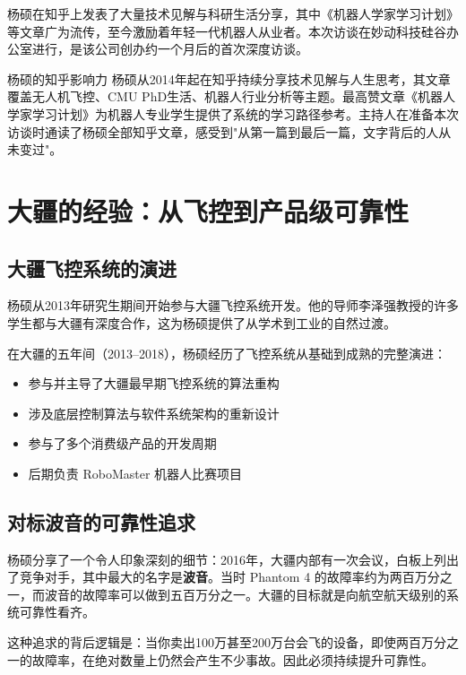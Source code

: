 \documentclass[a4paper]{article}
\begin{document}
杨硕在知乎上发表了大量技术见解与科研生活分享，其中《机器人学家学习计划》等文章广为流传，至今激励着年轻一代机器人从业者。本次访谈在妙动科技硅谷办公室进行，是该公司创办约一个月后的首次深度访谈。

\begin{knowledgebox}{杨硕的知乎影响力}
杨硕从2014年起在知乎持续分享技术见解与人生思考，其文章覆盖无人机飞控、CMU PhD生活、机器人行业分析等主题。最高赞文章《机器人学家学习计划》为机器人专业学生提供了系统的学习路径参考。主持人在准备本次访谈时通读了杨硕全部知乎文章，感受到"从第一篇到最后一篇，文字背后的人从未变过"。
\end{knowledgebox}


\section{大疆的经验：从飞控到产品级可靠性}

\subsection{大疆飞控系统的演进}

杨硕从2013年研究生期间开始参与大疆飞控系统开发。他的导师李泽强教授的许多学生都与大疆有深度合作，这为杨硕提供了从学术到工业的自然过渡。

在大疆的五年间（2013--2018），杨硕经历了飞控系统从基础到成熟的完整演进：
\begin{itemize}
    \item 参与并主导了大疆最早期飞控系统的算法重构
    \item 涉及底层控制算法与软件系统架构的重新设计
    \item 参与了多个消费级产品的开发周期
    \item 后期负责 RoboMaster 机器人比赛项目
\end{itemize}

\subsection{对标波音的可靠性追求}

杨硕分享了一个令人印象深刻的细节：2016年，大疆内部有一次会议，白板上列出了竞争对手，其中最大的名字是\textbf{波音}。当时 Phantom 4 的故障率约为两百万分之一，而波音的故障率可以做到五百万分之一。大疆的目标就是向航空航天级别的系统可靠性看齐。

这种追求的背后逻辑是：当你卖出100万甚至200万台会飞的设备，即使两百万分之一的故障率，在绝对数量上仍然会产生不少事故。因此必须持续提升可靠性。
\end{document}
